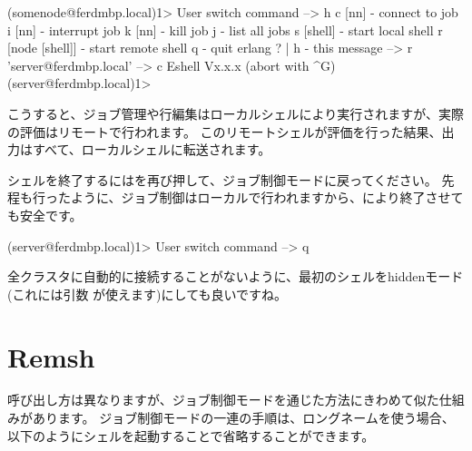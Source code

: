 \begin{VerbatimEshell}
(somenode@ferdmbp.local)1>
User switch command
 --> h
  c [nn]            - connect to job
  i [nn]            - interrupt job
  k [nn]            - kill job
  j                 - list all jobs
  s [shell]         - start local shell
  r [node [shell]]  - start remote shell
  q                 - quit erlang
  ? | h             - this message
 --> r 'server@ferdmbp.local'
 --> c
Eshell Vx.x.x  (abort with ^G)
(server@ferdmbp.local)1>
\end{VerbatimEshell}

こうすると、ジョブ管理や行編集はローカルシェルにより実行されますが、実際の評価はリモートで行われます。
このリモートシェルが評価を行った結果、出力はすべて、ローカルシェルに転送されます。

シェルを終了するにはを再び押して、ジョブ制御モードに戻ってください。
先程も行ったように、ジョブ制御はローカルで行われますから、により終了させても安全です。

\begin{VerbatimEshell}
(server@ferdmbp.local)1>
User switch command
 --> q
\end{VerbatimEshell}

全クラスタに自動的に接続することがないように、最初のシェルをhiddenモード(これには引数 が使えます)にしても良いですね。

\section{Remsh}

呼び出し方は異なりますが、ジョブ制御モードを通じた方法にきわめて似た仕組みがあります。
ジョブ制御モードの一連の手順は、ロングネームを使う場合、以下のようにシェルを起動することで省略することができます。

